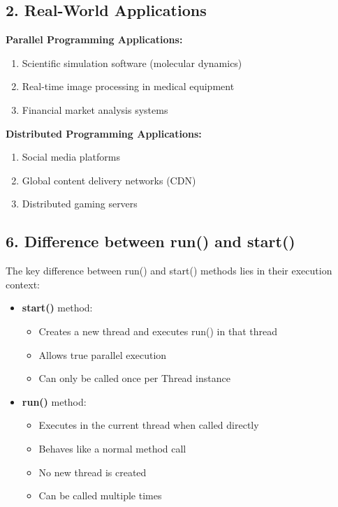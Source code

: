 \documentclass{article}
\begin{document}
\subsection*{2. Real-World Applications}

\textbf{Parallel Programming Applications:}
\begin{enumerate}
    \item Scientific simulation software (molecular dynamics)
    \item Real-time image processing in medical equipment
    \item Financial market analysis systems
\end{enumerate}

\textbf{Distributed Programming Applications:}
\begin{enumerate}
    \item Social media platforms
    \item Global content delivery networks (CDN)
    \item Distributed gaming servers
\end{enumerate}

\subsection*{6. Difference between run() and start()}

The key difference between run() and start() methods lies in their execution context:

\begin{itemize}
    \item \textbf{start()} method:
    \begin{itemize}
        \item Creates a new thread and executes run() in that thread
        \item Allows true parallel execution
        \item Can only be called once per Thread instance
    \end{itemize}
    \item \textbf{run()} method:
    \begin{itemize}
        \item Executes in the current thread when called directly
        \item Behaves like a normal method call
        \item No new thread is created
        \item Can be called multiple times
    \end{itemize}
\end{itemize}
\end{document}
